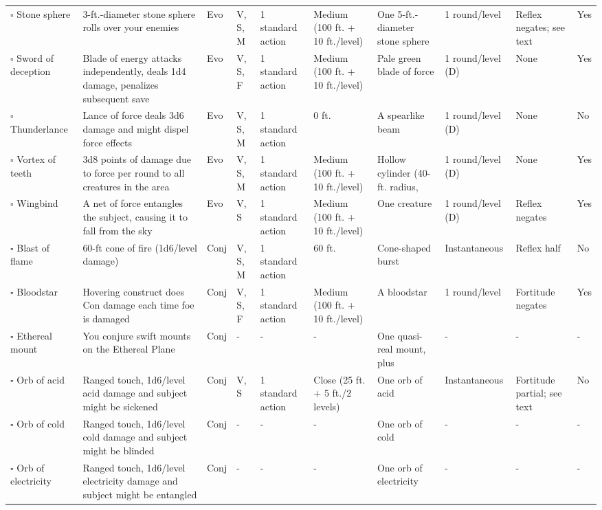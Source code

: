 \documentclass[12pt, a4paper]{article}
\begin{document}
\begin{center}
\begin{longtable}[H]{ p{8em} p{15em} p{2em} p{5em} p{6em} p{6em} p{10em} p{6em} p{5em} p{2em} }
    \(\square\) Stone sphere & 3-ft.-diameter stone sphere rolls over your enemies& Evo & V, S, M & 1 standard action & Medium (100 ft. + 10 ft./level) & One 5-ft.-diameter stone sphere & 1 round/level & Reﬂex negates; see text & Yes\\
    \(\square\) Sword of deception & Blade of energy attacks independently, deals 1d4 damage, penalizes subsequent save & Evo & V, S, F & 1 standard action & Medium (100 ft. + 10 ft./level) & Pale green blade of force & 1 round/level (D) & None & Yes\\
    \(\square\) Thunderlance & Lance of force deals 3d6 damage and might dispel force effects & Evo & V, S, M & 1 standard action & 0 ft. & A spearlike beam & 1 round/level (D) & None & No\\
    \(\square\) Vortex of teeth & 3d8 points of damage due to force per round to all creatures in the area & Evo & V, S, M & 1 standard action & Medium (100 ft. + 10 ft./level) & Hollow cylinder (40-ft. radius,  & 1 round/level (D) & None & Yes\\
    \(\square\) Wingbind & A net of force entangles the subject, causing it to fall from the sky & Evo & V, S & 1 standard action & Medium (100 ft. + 10 ft./level) & One creature & 1 round/level (D) & Reﬂex negates & Yes\\
    \(\square\) Blast of flame & 60-ft cone of ﬁre (1d6/level damage) & Conj & V, S, M & 1 standard action & 60 ft. & Cone-shaped burst & Instantaneous & Reﬂex half & No\\
    \(\square\) Bloodstar & Hovering construct does Con damage each time foe is damaged & Conj & V, S, F & 1 standard action & Medium (100 ft. + 10 ft./level) & A bloodstar & 1 round/level & Fortitude negates & Yes\\
    \(\square\) Ethereal mount & You conjure swift mounts on the Ethereal Plane & Conj & - & - & - & One quasi-real mount, plus  & - & - & -\\
    \(\square\) Orb of acid & Ranged touch, 1d6/level acid damage and subject might be sickened & Conj & V, S & 1 standard action & Close (25 ft. + 5 ft./2 levels) & One orb of acid & Instantaneous & Fortitude partial; see text & No\\
    \(\square\) Orb of cold & Ranged touch, 1d6/level cold damage and subject might be blinded & Conj & - & - & - & One orb of cold & - & - & -\\
    \(\square\) Orb of electricity & Ranged touch, 1d6/level electricity damage and subject might be entangled & Conj & - & - & - & One orb of electricity & - & - & -\\

\end{longtable}
\end{center}
\end{document}
